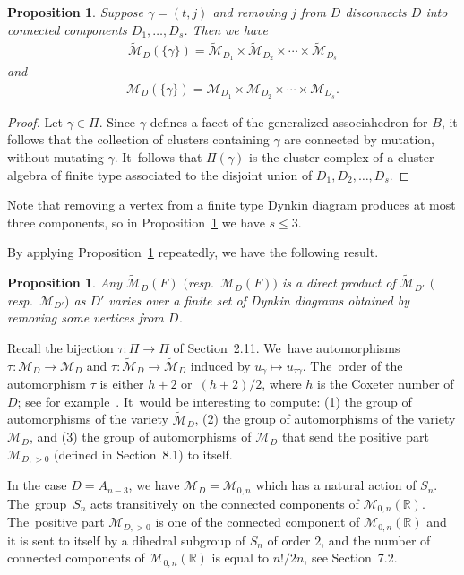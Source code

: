 \documentclass[pdftex]{sigma}%
\def\R{{\mathbb R}}
\def\M{{\mathcal{M}}}
\def\tM{{\widetilde {\mathcal{M}}}}
\numberwithin{equation}{section}
\newtheorem{Proposition}[Theorem]{Proposition}
\begin{document}
\begin{Proposition}\label{prop:divisorsplit}
Suppose $\gamma = (t,j)$ and removing $j$ from $D$ disconnects $D$ into connected components $D_1,\dots,D_s$.
Then we have \begin{gather*}\tM_D(\{\gamma\}) = \tM_{D_1} \times \tM_{D_2} \times \cdots \times \tM_{D_s}\end{gather*} and
\begin{gather*}\M_D(\{\gamma\}) = \M_{D_1} \times \M_{D_2} \times \cdots \times \M_{D_s}.\end{gather*}
\end{Proposition}
\begin{proof}
Let $\gamma \in \Pi$. Since $\gamma$ defines a facet of the generalized associahedron for $B$, it follows that the collection of clusters containing $\gamma$ are connected by mutation, without mutating $\gamma$. It~follows that $\Pi(\gamma)$ is the cluster complex of a cluster algebra of finite type associated to the disjoint union of $D_1,D_2,\dots,D_s$.
\end{proof}
Note that removing a vertex from a finite type Dynkin diagram produces at most three components, so in Proposition~\ref{prop:divisorsplit} we have $s \leq 3$.

By applying Proposition~\ref{prop:divisorsplit} repeatedly, we have the following result.
\begin{Proposition}
Any $\tM_D(F)$ $($resp.\ $\M_D(F))$ is a direct product of $\tM_{D'}$ $($resp.\ $\M_{D'})$ as $D'$ varies over a finite set of Dynkin diagrams obtained by removing some vertices from $D$.
\end{Proposition}

\bigskip{}
Recall the bijection $\tau\colon \Pi \to \Pi$ of Section~2.11. We~have automorphisms $\tau\colon \M_D \to \M_D$ and $\tau\colon \tM_D \to \tM_D$ induced by $u_\gamma \mapsto u_{\tau \gamma}$. The~order of the automorphism $\tau$ is either $h+2$ or~$(h+2)/2$, where $h$ is the Coxeter number of $D$; see for example~\cite{ASS}. It~would be interesting to compute: (1) the group of automorphisms of the variety $\tM_D$, (2) the group of automorphisms of the variety $\M_D$, and (3) the group of automorphisms of $\M_D$ that send the positive part~$\M_{D,>0}$ (defined in Section~8.1) to itself.

In the case $D = A_{n-3}$, we have $\M_D = \M_{0,n}$ which has a natural action of $S_n$. The~group~$S_n$ acts transitively on the connected components of $\M_{0,n}(\R)$. The~positive part $\M_{D,>0}$ is one of the connected component of $\M_{0,n}(\R)$ and it is sent to itself by a dihedral subgroup of $S_n$ of order $2$, and the number of connected components of $\M_{0,n}(\R)$ is equal to $n!/2n$, see Section~7.2.
\end{document}
